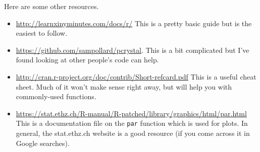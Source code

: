 \documentclass[12pt]{article}
\begin{document}
Here are some other resources.
\begin{itemize}
	\item \url{http://learnxinyminutes.com/docs/r/} This is a pretty basic guide but is the easiest to follow.
	\item \url{https://github.com/sampollard/pcrystal}. This is a bit complicated but I've found looking at other people's code can help.
	\item \url{http://cran.r-project.org/doc/contrib/Short-refcard.pdf} This is a useful cheat sheet. Much of it won't make sense right away, but will help you with commonly-used functions.
	\item \url{https://stat.ethz.ch/R-manual/R-patched/library/graphics/html/par.html} This is a documentation file on the \verb|par| function which is used for plots. In general, the stat.ethz.ch website is a good resource (if you come across it in Google searches).
\end{itemize}
\end{document}
